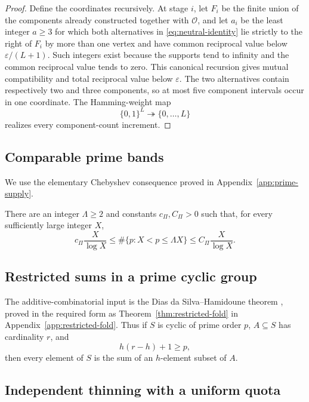 \begin{proof}
Define the coordinates recursively.  At stage $i$, let $F_i$ be the finite union of the components already constructed together with $\mathcal O$, and let $a_i$ be the least integer $a\ge3$ for which both alternatives in \eqref{eq:neutral-identity} lie strictly to the right of $F_i$ by more than one vertex and have common reciprocal value below $\varepsilon/(L+1)$.  Such integers exist because the supports tend to infinity and the common reciprocal value tends to zero.  This canonical recursion gives mutual compatibility and total reciprocal value below $\varepsilon$.  The two alternatives contain respectively two and three components, so at most five component intervals occur in one coordinate.  The Hamming-weight map
\[
\{0,1\}^L\twoheadrightarrow\{0,\ldots,L\}
\]
realizes every component-count increment.
\end{proof}


\subsection{Comparable prime bands}

We use the elementary Chebyshev consequence proved in Appendix~\ref{app:prime-supply}.

\begin{proposition}\label{prop:prime-supply-main}
There are an integer $\Lambda\ge2$ and constants $c_\Pi,C_\Pi>0$ such that, for every sufficiently large integer $X$,
\[
c_\Pi\frac X{\log X}
\le
\#\{p:X<p\le\Lambda X\}
\le
C_\Pi\frac X{\log X}.
\]
\end{proposition}

\subsection{Restricted sums in a prime cyclic group}

The additive-combinatorial input is the Dias da Silva--Hamidoune theorem \cite{DiasDaSilvaHamidoune1994}, proved in the required form as Theorem~\ref{thm:restricted-fold} in Appendix~\ref{app:restricted-fold}.  Thus if $S$ is cyclic of prime order $p$, $A\subseteq S$ has cardinality $r$, and
\[
h(r-h)+1\ge p,
\]
then every element of $S$ is the sum of an $h$-element subset of $A$.

\subsection{Independent thinning with a uniform quota}

